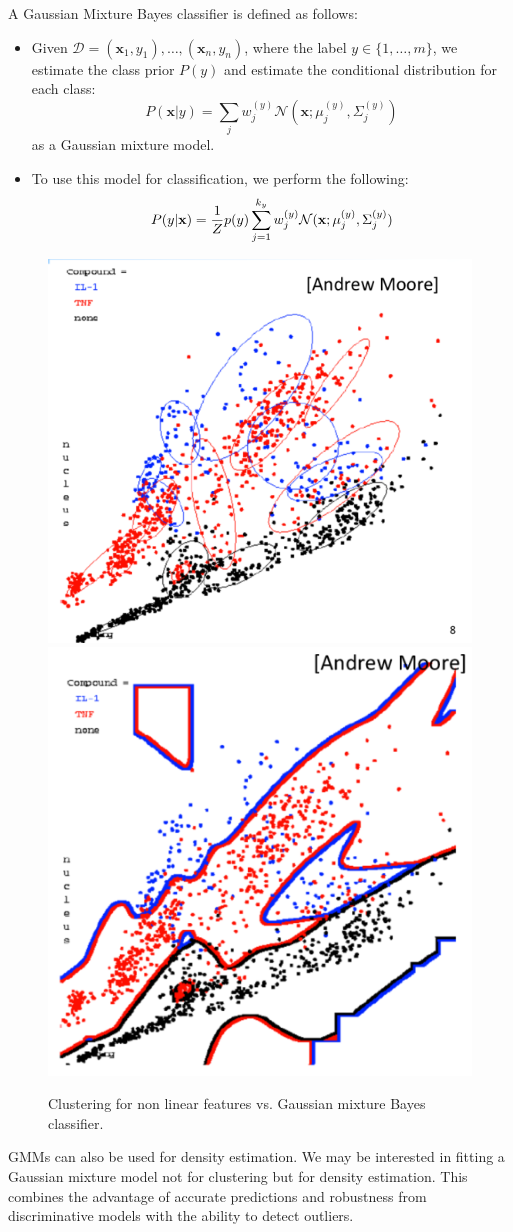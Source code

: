 \documentclass[a4paper,10pt,twoside]{article}
\begin{document}
 A Gaussian Mixture Bayes classifier is defined as follows:

 \begin{itemize}
 \item Given $\mathcal{D} = {(\mathbf{x}_1,y_1),\ldots,(\mathbf{x}_n,y_n)}$, where the label $y\in\{1,\ldots, m\}$, we estimate the class prior $P(y)$ and estimate the conditional distribution for each class:
 \begin{equation*}
   P(\mathbf{x}|y)=\sum_j w_j^{(y)}\mathcal{N}(\mathbf{x};\mu_{j}^{(y)},\Sigma_j^{(y)})
 \end{equation*} as a Gaussian mixture model.
\item To use this model for classification, we perform the following:
  \begin{equation*}
    P(y|\mathbf{x})={1\over Z}p(y)\sum_{j=1}^{k_y}w_j^{(y)}\mathcal{N}(\mathbf{x};\mu_j^{(y)},\Sigma_j^{(y)})
  \end{equation*}
 \end{itemize}

 \begin{figure}
   \centering
   \includegraphics[width=.3\textwidth]{figures/clustering_for_non_linear_classification.png}
   \includegraphics[width=.3\textwidth]{figures/gaussian_mixture_model.png}
   \caption{Clustering for non linear features vs. Gaussian mixture Bayes classifier.}
   \label{fig:power_of_bayes}
 \end{figure}

GMMs can also be used for density estimation. We may be interested in fitting a Gaussian mixture model not for clustering but for density estimation. This combines the advantage of accurate predictions and robustness from discriminative models with the ability to detect outliers.
\end{document}
